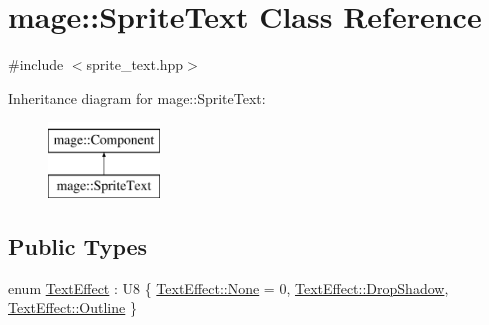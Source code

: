 \hypertarget{classmage_1_1_sprite_text}{}\section{mage\+:\+:Sprite\+Text Class Reference}
\label{classmage_1_1_sprite_text}


{\ttfamily \#include $<$sprite\+\_\+text.\+hpp$>$}

Inheritance diagram for mage\+:\+:Sprite\+Text\+:\begin{figure}[H]
\begin{center}
\leavevmode
\includegraphics[height=2.000000cm]{classmage_1_1_sprite_text}
\end{center}
\end{figure}
\subsection*{Public Types}
\begin{DoxyCompactItemize}
\item 
enum \hyperlink{classmage_1_1_sprite_text_a4d3101d037b6fe4247d77b5fbf811dd2}{Text\+Effect} \+: U8 \{ \hyperlink{classmage_1_1_sprite_text_a4d3101d037b6fe4247d77b5fbf811dd2a6adf97f83acf6453d4a6a4b1070f3754}{Text\+Effect\+::\+None} = 0, 
\hyperlink{classmage_1_1_sprite_text_a4d3101d037b6fe4247d77b5fbf811dd2a62fb0c043d7459d6590e00540884ea62}{Text\+Effect\+::\+Drop\+Shadow}, 
\hyperlink{classmage_1_1_sprite_text_a4d3101d037b6fe4247d77b5fbf811dd2a606b51cc1c9d0b4af394419a22f2ff1f}{Text\+Effect\+::\+Outline}
 \}
\end{DoxyCompactItemize}
